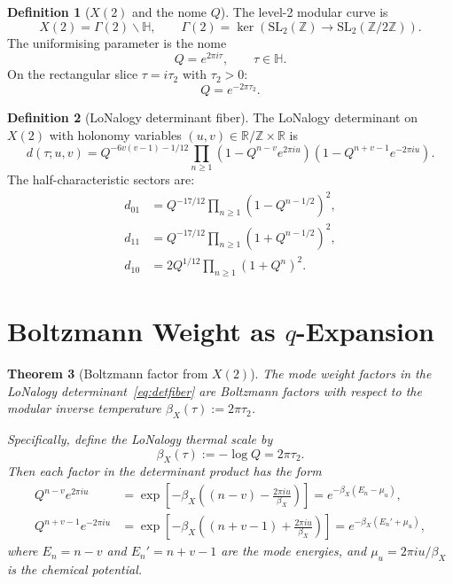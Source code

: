\documentclass[12pt]{article}
\theoremstyle{plain}
\newtheorem{theorem}{Theorem}[section]
\theoremstyle{definition}
\newtheorem{definition}[theorem]{Definition}
\numberwithin{equation}{section}
\newcommand{\R}{\mathbb{R}}
\newcommand{\Z}{\mathbb{Z}}
\newcommand{\HH}{\mathbb{H}}
\begin{document}
\begin{definition}[$X(2)$ and the nome $Q$]
The level-2 modular curve is
\begin{equation}
X(2) = \Gamma(2)\backslash\HH,\qquad
\Gamma(2) = \ker\!\left(\mathrm{SL}_2(\Z)\to\mathrm{SL}_2(\Z/2\Z)\right).
\end{equation}
The uniformising parameter is the nome
\begin{equation}
Q = e^{2\pi i\tau},\qquad \tau\in\HH.
\end{equation}
On the rectangular slice $\tau=i\tau_2$ with $\tau_2>0$:
\begin{equation}\label{eq:nomerect}
Q = e^{-2\pi\tau_2}.
\end{equation}
\end{definition}

\begin{definition}[LoNalogy determinant fiber]\label{def:detfiber}
The LoNalogy determinant on $X(2)$ with holonomy variables
$(u,v)\in\R/\Z\times\R$ is~\cite{LoNalogyv87}
\begin{equation}\label{eq:detfiber}
d(\tau;u,v)
= Q^{-6v(v-1)-1/12}\prod_{n\geq 1}
\left(1-Q^{n-v}e^{2\pi iu}\right)
\left(1-Q^{n+v-1}e^{-2\pi iu}\right).
\end{equation}
The half-characteristic sectors are:
\begin{align}
d_{01} &= Q^{-17/12}\prod_{n\geq1}\left(1-Q^{n-1/2}\right)^2,\label{eq:d01}\\
d_{11} &= Q^{-17/12}\prod_{n\geq1}\left(1+Q^{n-1/2}\right)^2,\label{eq:d11}\\
d_{10} &= 2Q^{1/12}\prod_{n\geq1}\left(1+Q^n\right)^2.\label{eq:d10}
\end{align}
\end{definition}


\section{Boltzmann Weight as $q$-Expansion}\label{sec:boltzmann}

\begin{theorem}[Boltzmann factor from $X(2)$]\label{thm:boltzmann}
The mode weight factors in the LoNalogy determinant~\eqref{eq:detfiber}
are Boltzmann factors with respect to the modular inverse temperature
$\beta_X(\tau):=2\pi\tau_2$.

Specifically, define the LoNalogy thermal scale by
\begin{equation}\label{eq:betaX}
\boxed{\beta_X(\tau) := -\log Q = 2\pi\tau_2.}
\end{equation}
Then each factor in the determinant product has the form
\begin{align}
Q^{n-v}e^{2\pi iu}
&= \exp\!\left[-\beta_X\left((n-v)-\frac{2\pi iu}{\beta_X}\right)\right]
= e^{-\beta_X(E_n-\mu_u)},\\
Q^{n+v-1}e^{-2\pi iu}
&= \exp\!\left[-\beta_X\left((n+v-1)+\frac{2\pi iu}{\beta_X}\right)\right]
= e^{-\beta_X(E_n'+\mu_u)},
\end{align}
where $E_n=n-v$ and $E_n'=n+v-1$ are the mode energies, and
$\mu_u=2\pi iu/\beta_X$ is the chemical potential.
\end{theorem}
\end{document}
